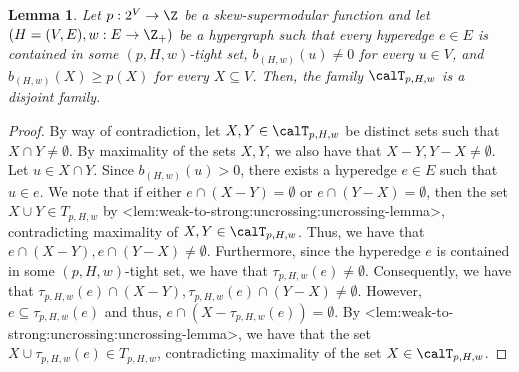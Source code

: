 \documentclass{article}
\def\Cref#1{<#1>}%
\newtheorem{lemma}{Lemma}[section]
\newcommand{\maximalTightSetFamily}[1]{\ensuremath{\calT_{#1}}\xspace}
\newcommand{\tightSetFamily}[1]{\ensuremath{T_{#1}}\xspace}
\newcommand{\maximalTightSetContainingHyperedge}[1]{\ensuremath{\tau_{#1}}\xspace}
\begin{document}
\begin{lemma}\label{lem:weak-to-strong:uncrossing:maximal-tight-set-family-disjoint}
    Let $p:2^V\rightarrow\Z$ be a skew-supermodular function and let $\left(H = (V, E), w:E \rightarrow\Z_+\right)$ be a hypergraph 
    such that every hyperedge $e \in E$ is contained in some $(p, H, w)$-tight set, $b_{(H,w)}(u) \not = 0$ for every $u \in V$, and $b_{(H,w)}(X) \geq p(X)$ for every $X \subseteq V$. 
    Then, the family $\maximalTightSetFamily{p, H, w}$ is a disjoint family.
\end{lemma}
\begin{proof}
By way of contradiction, let $X, Y \in \maximalTightSetFamily{p, H, w}$ be distinct sets such that $X\cap Y \not = \emptyset$. By maximality of the sets $X, Y$, we also have that $X - Y, Y - X \not = \emptyset$. Let $u \in X\cap Y$. Since $b_{(H,w)}(u) > 0$, there exists a hyperedge $e \in E$ such that $u \in e$. We note that if either $e\cap (X - Y) = \emptyset$ or $e\cap (Y - X) = \emptyset$, then the set $X \cup Y \in \tightSetFamily{p, H, w}$ by \Cref{lem:weak-to-strong:uncrossing:uncrossing-lemma}, contradicting maximality of $X, Y \in \maximalTightSetFamily{p, H, w}$. Thus, we have that $e \cap (X - Y), e \cap (Y - X) \not= \emptyset$. Furthermore, since the hyperedge $e$ is contained in some $(p, H, w)$-tight set, we have that  $\maximalTightSetContainingHyperedge{p, H, w}(e) \not = \emptyset$. Consequently, we have that $\maximalTightSetContainingHyperedge{p, H, w}(e)\cap (X - Y), \maximalTightSetContainingHyperedge{p, H, w}(e) \cap (Y - X) \not = \emptyset$. However, $e \subseteq \maximalTightSetContainingHyperedge{p, H, w}(e)$ and thus, $e \cap (X - \maximalTightSetContainingHyperedge{p, H, w}(e)) = \emptyset$. By \Cref{lem:weak-to-strong:uncrossing:uncrossing-lemma}, we have that the set $X \cup \maximalTightSetContainingHyperedge{p, H, w}(e) \in \tightSetFamily{p, H, w}$, contradicting maximality of the set $X \in \maximalTightSetFamily{p, H, w}$.
\end{proof}
\end{document}
